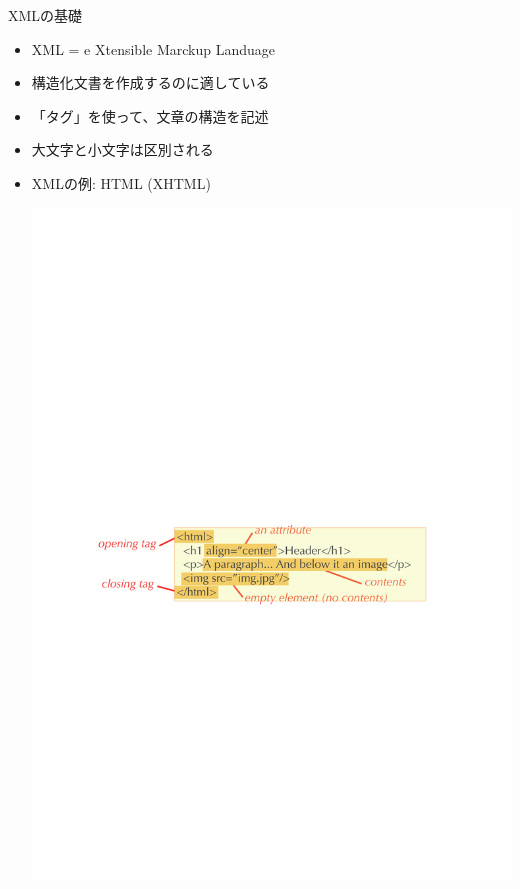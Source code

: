 \begin{frame}{XMLの基礎}
  \begin{itemize}
  \item XML = e{\color{red} X}tensible {\color{red} M}arckup {\color{red} L}anduage
  \item 構造化文書を作成するのに適している
  \item 「タグ」を使って、文章の構造を記述
  \item 大文字と小文字は区別される
  \item XMLの例: HTML (XHTML)
  \begin{center}
    \includegraphics[height=0.3\textheight]{xml1.pdf}
  \end{center}
  \end{itemize}
\end{frame}

